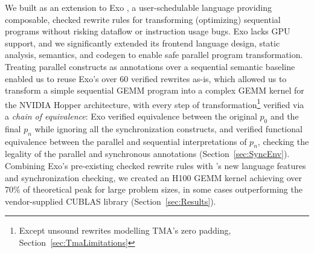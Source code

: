 We built \sporkName{} as an extension to Exo \cite{exo, exo2}, a user-schedulable language providing composable, checked rewrite rules for transforming (optimizing) sequential programs without risking dataflow or instruction usage bugs.
Exo lacks GPU support, and we significantly extended its frontend language design, static analysis, semantics, and codegen to enable safe parallel program transformation.
Treating parallel constructs as annotations over a sequential semantic baseline enabled us to reuse Exo's over 60 verified rewrites as-is, which allowed us to transform a simple sequential GEMM program into a complex GEMM kernel for the NVIDIA Hopper architecture, with every step of transformation\footnote{Except unsound rewrites modelling TMA's zero padding, Section~\ref{sec:TmaLimitations}} verified via a \emph{chain of equivalence}: Exo verified equivalence between the original $p_0$ and the final $p_n$ while ignoring all the synchronization constructs, and \sporkName{} verified functional equivalence between the parallel and sequential interpretations of $p_n$, checking the legality of the parallel and synchronous annotations (Section~\ref{sec:SyncEnv}).
%
Combining Exo's pre-existing checked rewrite rules with \sporkName{}'s new language features and synchronization checking,
we created an H100 GEMM kernel achieving over 70\% of theoretical peak for large problem sizes,
in some cases outperforming the vendor-supplied CUBLAS library (Section~\ref{sec:Results}).

